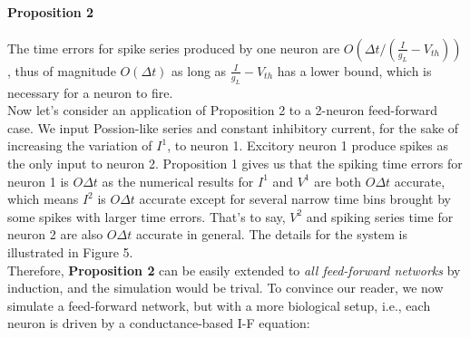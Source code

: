 \documentclass[10pt]{article}
\begin{document}
\begin{multicols}{2}
\paragraph{Proposition 2} The time errors for spike series produced by one neuron are $O(\Delta t/(\frac{I}{g_L}-V_{th}))$, thus of magnitude $O(\Delta t)$ as long as $\frac{I}{g_L}-V_{th}$ has a lower bound, which is necessary for a neuron to fire.  \\

\indent
Now let's consider an application of Proposition 2 to a 2-neuron feed-forward case. We input Possion-like series and constant inhibitory current, for the sake of increasing the variation of $I^1$, to neuron 1. Excitory neuron 1 produce spikes as the only input to neuron 2. Proposition 1 gives us that the spiking time errors for neuron 1 is $O\Delta t$ as the numerical results for $I^1$ and $V^1$ are both $O\Delta t$ accurate, which means $I^2$ is $O\Delta t$ accurate except for several narrow time bins brought by some spikes with larger time errors. That's to say, $V^2$ and spiking series time for neuron 2 are also $O\Delta t$ accurate in general.  The details for the system is illustrated in Figure 5. \\

\indent
Therefore, {\bf{Proposition 2}} can be easily extended to \emph{all feed-forward networks} by induction, and the simulation would be trival. To convince our reader, we now simulate a feed-forward network, but with a more biological setup, i.e., each neuron is driven by a conductance-based I-F equation:
\end{multicols}
\end{document}
